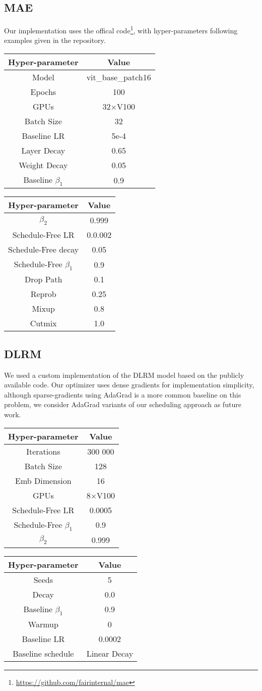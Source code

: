 \documentclass{article}
\begin{document}
\subsection{MAE}
Our implementation uses the offical code\footnote{\url{https://github.com/fairinternal/mae}}, with hyper-parameters following examples given in the repository. 

\begin{tabular}[t]{|c|c|}
\hline 
\textbf{Hyper-parameter}  & \textbf{Value}\tabularnewline
\hline
Model  & vit\_base\_patch16\tabularnewline
\hline 
Epochs & 100 \tabularnewline
\hline 
GPUs  & 32$\times $V100\tabularnewline
\hline 
Batch Size & 32 \tabularnewline
\hline 
Baseline LR & 5e-4 \tabularnewline
\hline 
Layer Decay & 0.65 \tabularnewline
\hline 
Weight Decay & 0.05 \tabularnewline
\hline 
Baseline $\beta_1$ & 0.9 \tabularnewline
\hline
\end{tabular}
\quad
\begin{tabular}[t]{|c|c|}
\hline 
\textbf{Hyper-parameter}  & \textbf{Value}\tabularnewline
\hline
$\beta_2$ & 0.999 \tabularnewline
\hline 
Schedule-Free LR & 0.0.002\tabularnewline
\hline 
Schedule-Free decay & 0.05 \tabularnewline
\hline 
Schedule-Free $\beta_1$ & 0.9 \tabularnewline
\hline 
Drop Path & 0.1 \tabularnewline
\hline 
Reprob & 0.25 \tabularnewline
\hline 
Mixup & 0.8 \tabularnewline
\hline 
Cutmix & 1.0 \tabularnewline
\hline 
\end{tabular}

\subsection{DLRM}
We used a custom implementation of the DLRM model based on the publicly available code. Our optimizer  uses dense gradients for implementation simplicity, although sparse-gradients using AdaGrad is a more common baseline on this problem, we consider AdaGrad variants of our scheduling approach as future work.

\begin{tabular}[t]{|c|c|}
\hline 
\textbf{Hyper-parameter} & \textbf{Value}\tabularnewline
\hline
Iterations & 300 000\tabularnewline
\hline
Batch Size & 128\tabularnewline
\hline 
Emb Dimension & 16\tabularnewline
\hline 
GPUs  & 8$\times $V100\tabularnewline
\hline
Schedule-Free LR & 0.0005 \tabularnewline
\hline 
Schedule-Free $\beta_1$ & 0.9 \tabularnewline
\hline
$\beta_2$ & 0.999 \tabularnewline
\hline 
\end{tabular}
\quad
\begin{tabular}[t]{|c|c|}
\hline 
\textbf{Hyper-parameter} & \textbf{Value}\tabularnewline
\hline
Seeds & 5\tabularnewline
\hline 
Decay & 0.0\tabularnewline
\hline
Baseline $\beta_1$ & 0.9 \tabularnewline
\hline 
Warmup & 0 \tabularnewline
\hline
Baseline LR & 0.0002 \tabularnewline
\hline
Baseline schedule & Linear Decay \tabularnewline
\hline
\end{tabular}
\end{document}
